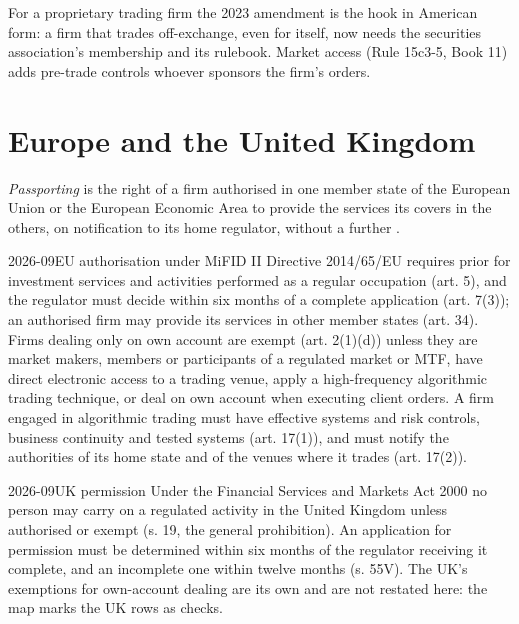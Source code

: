 For a proprietary trading firm the 2023 amendment is the hook in American form: a firm that trades off-exchange, even for itself, now needs the
securities association's membership and its rulebook. Market access (Rule 15c3-5, Book 11) adds pre-trade controls whoever sponsors the firm's
orders.

\section{Europe and the United Kingdom}

\begin{definition}[Passporting]\label{def:fm:regulators-and-licences:passport}
\emph{Passporting} is the right of a firm authorised in one member state of the European Union or the European Economic Area to
provide the services its  covers in the others, on notification to its home regulator, without a further .
\end{definition}

\begin{dated}{2026-09}{EU authorisation under MiFID II}\label{dat:fm:regulators-and-licences:eu}
Directive 2014/65/EU requires prior  for investment services and activities performed as a regular occupation (art. 5), and the
regulator must decide within six months of a complete application (art. 7(3)); an authorised firm may provide its services in other member states
(art. 34). Firms dealing only on own account are exempt (art. 2(1)(d)) unless they are market makers, members or participants of a regulated
market or MTF, have direct electronic access to a trading venue, apply a high-frequency algorithmic trading technique, or deal on own account
when executing client orders. A firm engaged in algorithmic trading must have effective systems and risk controls, business continuity and tested
systems (art. 17(1)), and must notify the authorities of its home state and of the venues where it trades (art. 17(2)).
\end{dated}

\begin{dated}{2026-09}{UK permission}\label{dat:fm:regulators-and-licences:uk}
Under the Financial Services and Markets Act 2000 no person may carry on a regulated activity in the United Kingdom unless authorised or exempt
(s. 19, the general prohibition). An application for permission must be determined within six months of the regulator receiving it complete, and
an incomplete one within twelve months (s. 55V). The UK's exemptions for own-account dealing are its own and are not restated here: the map marks
the UK rows as checks.
\end{dated}

